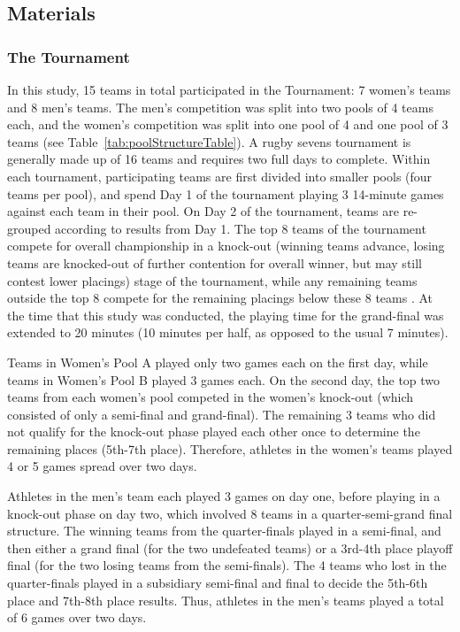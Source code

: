 \begin{CJK}{UTF8}{gbsn}
\subsection{Materials}

\subsubsection{The Tournament}
In this study, 15 teams in total participated in the Tournament: 7 women's teams and 8 men's teams. The men's competition was split into two pools of 4 teams each, and the women's competition was split into one pool of 4 and one pool of 3 teams (see Table~\ref{tab:poolStructureTable}).  A rugby sevens tournament is generally made up of 16 teams and requires two full days to complete.  Within each tournament, participating teams are first divided into smaller pools (four teams per pool), and spend Day 1 of the tournament playing 3 14-minute games against each team in their pool. On Day 2 of the tournament, teams are re-grouped according to results from Day 1.  The top 8 teams of the tournament compete for overall championship in a knock-out (winning teams advance, losing teams are knocked-out of further contention for overall winner, but may still contest lower placings) stage of the tournament, while any remaining teams outside the top 8 compete for the remaining placings below these 8 teams \citep[][]{WorldRugby2018}. At the time that this study was conducted, the playing time for the grand-final was extended to 20 minutes (10 minutes per half, as opposed to the usual 7 minutes).



Teams in Women's Pool A played only two games each on the first day, while teams in Women's Pool B played 3 games each. On the second day, the top two teams from each women's pool competed in the women's knock-out (which consisted of only a semi-final and grand-final).  The remaining 3 teams who did not qualify for the knock-out phase played each other once to determine the remaining places (5th-7th place).  Therefore, athletes in the women's teams played 4 or 5 games spread over two days.

Athletes in the men's team each played 3 games on day one, before playing in a knock-out phase on day two, which involved 8 teams in a quarter-semi-grand final structure. The winning teams from the quarter-finals played in a semi-final, and then either a grand final (for the two undefeated teams) or a 3rd-4th place playoff final (for the two losing teams from the semi-finals). The 4 teams who lost in the quarter-finals played in a subsidiary semi-final and final to decide the 5th-6th place and 7th-8th place results. Thus, athletes in the men's teams played a total of 6 games over two days.



\end{CJK}
